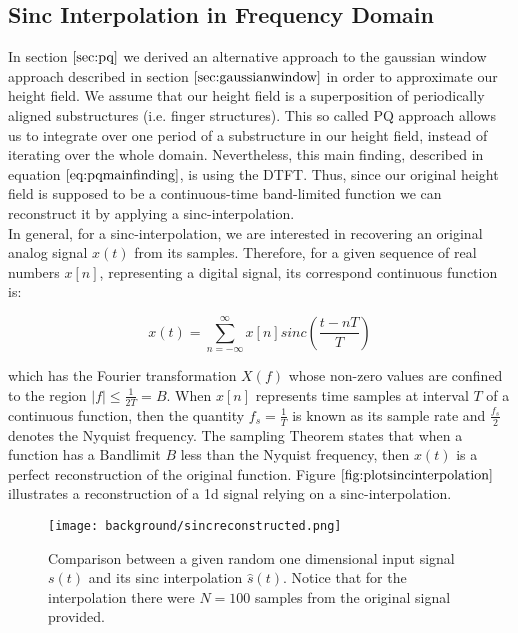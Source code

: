 \subsection{Sinc Interpolation in Frequency Domain}
\label{sec:sincinterpolation}
In section $\ref{sec:pq}$ we derived an alternative approach to the gaussian window approach described in section $\ref{sec:gaussianwindow}$ in order to approximate our height field. We assume that our height field is a superposition of periodically aligned substructures (i.e. finger structures). This so called PQ approach allows us to integrate over one period of a substructure in our height field, instead of iterating over the whole domain. Nevertheless, this main finding, described in equation $\ref{eq:pqmainfinding}$, is using the DTFT. Thus, since our original height field is supposed to be a continuous-time band-limited function we can reconstruct it by applying a sinc-interpolation. \\

In general, for a sinc-interpolation, we are interested in recovering an original analog signal $x(t)$ from its samples. Therefore, for a given sequence of real numbers $x[n]$, representing a digital signal, its correspond continuous function is: 

\begin{equation}
  x(t) = \sum_{n=-\infty}^{\infty} x[n] sinc\left(\frac{t-nT}{T}\right)
\end{equation}

which has the Fourier transformation $X(f)$ whose non-zero values are confined to the region $|f| \leq \frac{1}{2T} = B$.
When $x[n]$ represents time samples at interval $T$ of a continuous function, then the quantity $f_s = \frac{1}{T}$ is known as its sample rate and $\frac{f_s}{2}$ denotes the Nyquist frequency. The sampling Theorem states that when a function has a Bandlimit $B$ less than the Nyquist frequency, then $x(t)$ is a perfect reconstruction of the original function. Figure $\ref{fig:plotsincinterpolation}$ illustrates a reconstruction of a 1d signal relying on a sinc-interpolation.  

\begin{figure}[ht]
  \centering
  \texttt{[image: background/sincreconstructed.png]}
  \caption[Sinc Interpolation Approximation]{Comparison between a given random one dimensional input signal $s(t)$ and its sinc interpolation $\hat{s}(t)$. Notice that for the interpolation there were $N=100$ samples from the original signal provided.}
  \label{fig:plotsincinterpolation}  
\end{figure}
